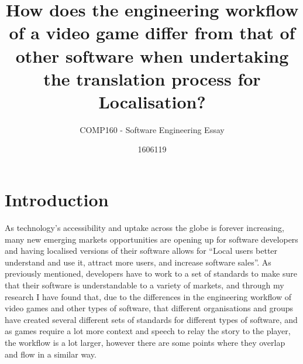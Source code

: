 \documentclass{scrartcl}
\title{How does the engineering workflow of a video game differ from that of other software when undertaking the translation process for Localisation?}
\subtitle{COMP160 - Software Engineering Essay}
\author{1606119}
\begin{document}
\maketitle



\section{Introduction}
As technology's accessibility and uptake across the globe is forever increasing, many new emerging markets opportunities are opening up for software developers and having localised versions of their software allows for ``Local users better understand and use it, attract more users, and increase software sales''\cite[pg.1]{6601827}. As previously mentioned, developers have to work to a set of standards to make sure that their software is understandable to a variety of markets, and through my research I have found that, due to the differences in the engineering workflow of video games and other types of software, that different organisations and groups have created several different sets of standards for different types of software, and as games require a lot more context and speech to relay the story to the player, the workflow is a lot larger, however there are some points where they overlap and flow in a similar way. 
\end{document}
